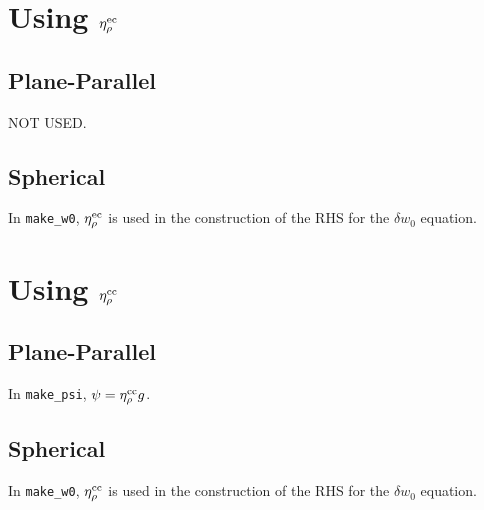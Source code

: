 \section{Using $\eta_{\rho}^{\rm ec}$}
\subsection{Plane-Parallel}
NOT USED.

\subsection{Spherical}
In {\tt make\_w0}, $\eta_{\rho}^{\rm ec}$ is used in the construction of the RHS
for the $\delta w_0$ equation.

\section{Using $\eta_{\rho}^{\rm cc}$}
\subsection{Plane-Parallel}
In {\tt make\_psi}, $\psi = \eta_{\rho}^{\rm cc} g$.

\subsection{Spherical}
In {\tt make\_w0}, $\eta_{\rho}^{\rm cc}$ is used in the construction of the RHS
for the $\delta w_0$ equation.

